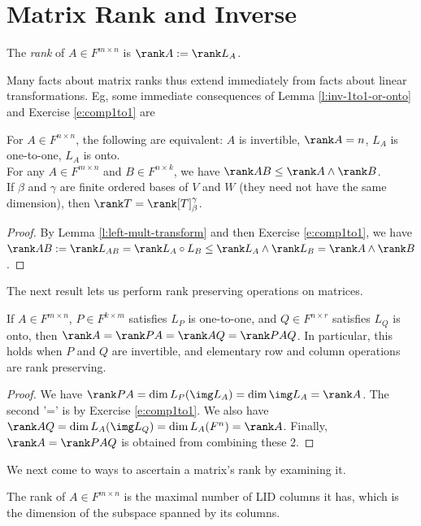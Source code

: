 \section{Matrix Rank and Inverse}
\begin{defn}
The \emph{rank} of $A \in F^{m \times n}$ is $\rank A:= \rank L_A$.
\end{defn}
Many facts about matrix ranks thus extend immediately from facts about linear transformations. Eg, some immediate consequences of Lemma \ref{l:inv-1to1-or-onto} and Exercise \ref{e:comp1to1} are
\begin{lem}\label{l:mat-inv-1to1}
For $A \in F^{n \times n}$, the following are equivalent: $A$ is invertible, $\rank A=n$, $L_A$ is one-to-one, $L_A$ is onto.\\ 
For any $A \in F^{m \times n}$ and $B \in F^{n \times k}$, we have $\rank AB \leq \rank A \wedge \rank B$.\\
If $\beta$ and $\gamma$ are finite ordered bases of $V$ and $W$ (they need not have the same dimension), then $\rank T= \rank [T]_\beta^\gamma$.
\end{lem}
\begin{proof}
By Lemma \ref{l:left-mult-transform} and then Exercise \ref{e:comp1to1}, we have $\rank AB:= \rank L_{AB}= \rank L_A \circ L_B \leq \rank L_A \wedge \rank L_B= \rank A \wedge \rank B$.
\end{proof}
The next result lets us perform rank preserving operations on matrices.
\begin{lem}\label{l:rank-preserve}
If $A \in F^{m \times n}$, $P \in F^{k \times m}$ satisfies $L_P$ is one-to-one, and $Q \in F^{n \times r}$ satisfies $L_Q$ is onto, then $\rank A= \rank PA= \rank AQ= \rank PAQ$. In particular, this holds when $P$ and $Q$ are invertible, and elementary row and column operations are rank preserving.
\end{lem}
\begin{proof}%
We have $\rank PA= \dim L_P(\img L_A)= \dim \img L_A= \rank A$. The second '=' is by Exercise \ref{e:comp1to1}. We also have $\rank AQ= \dim L_A(\img L_Q)= \dim L_A(F^n)= \rank A$. Finally, $\rank A= \rank PAQ$ is obtained from combining these 2.
\end{proof}
We next come to ways to ascertain a matrix's rank by examining it.
\begin{lem}\label{l:rank-colspace}
The rank of $A \in F^{m \times n}$ is the maximal number of LID columns it has, which is the dimension of the subspace spanned by its columns.
\end{lem}
